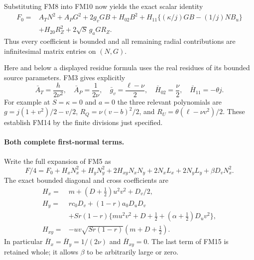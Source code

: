 Substituting FM8 into FM10 now yields the exact scalar identity
\[
\begin{split}
 F_0={}&A_TN^2+A_PG^2+2g_vGB+H_{02}B^2
          +H_{11}\{(\kappa/j)GB-(1/j)NB_u\}\\
       &+H_{20}R_Z^2+2\sqrt S\,g_aGR_Z.
\end{split}\tag{FM13}
\]
Thus every coefficient is bounded and all remaining radial
contributions are infinitesimal matrix entries on $(N,G)$.

Here and below a displayed residue formula uses the real residues
of its bounded source parameters. FM3 gives explicitly
\[
 \bar A_T=\frac h{2\nu^2},\quad
 \bar A_P=\frac1{2\nu},\quad
 \bar g_v=\frac{\ell-\nu}{2},\quad
 \bar H_{02}=\frac\nu2,\quad \bar H_{11}=-\theta j.
 \tag{FM14}
\]
For example at $S=\kappa=0$ and $a=0$ the three relevant
polynomials are
$g=j(1+v^2)/2-v/2$,
$R_Q=\nu(v-b)^2/2$, and
$R_U=\theta(\ell-\nu v^2)/2$.
These establish FM14 by the finite divisions just specified.

\paragraph{Both complete first-normal terms.}
Write the full expansion of FM5 as
\[
 F/4=F_0+H_xN_x^2+H_yN_y^2+2H_{xy}N_xN_y
                  +2N_xL_x+2N_yL_y+\beta D_vN_x^2.
 \tag{FM15}
\]
The exact bounded diagonal and cross coefficients are
\[
\begin{split}
 H_x={}&m+(D+\tfrac12)u^2v^2+D_v/2,\\
 H_y={}&r c_0D_v+(1-r)a_0D_uD_v\\
       &+Sr(1-r)\{mu^2v^2+D+\tfrac12
                            +(\alpha+\tfrac12)D_uv^2\},\\
 H_{xy}={}&-uv\sqrt{Sr(1-r)}(m+D+\tfrac12).
\end{split}\tag{FM16}
\]
In particular $\bar H_x=\bar H_y=1/(2\nu)$ and
$\bar H_{xy}=0$. The last term of FM15 is retained whole;
it allows $\beta$ to be arbitrarily large or zero.


